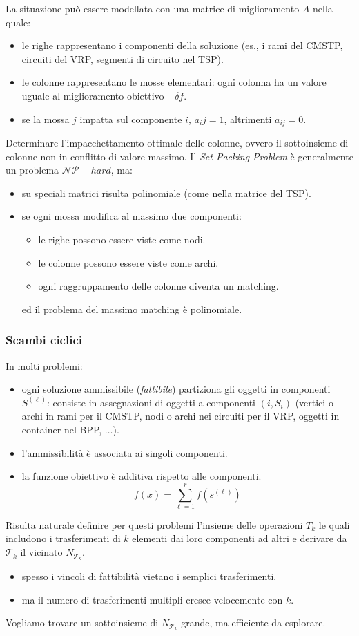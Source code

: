 \documentclass{article}
\begin{document}
La situazione può essere modellata con una matrice di miglioramento $A$ nella quale:
\begin{itemize}
    \item le righe rappresentano i componenti della soluzione (es., i rami del
    CMSTP, circuiti del VRP, segmenti di circuito nel TSP).
    \item le colonne rappresentano le mosse elementari: ogni colonna ha un valore
    uguale al miglioramento obiettivo $-\delta f$.
    \item se la mossa $j$ impatta sul componente $i$, $a_{i}j=1$, altrimenti $a_{ij}=0$.
\end{itemize}
Determinare l'impacchettamento ottimale delle colonne, ovvero il sottoinsieme di
colonne non in conflitto di valore massimo.
Il \textit{Set Packing Problem} è generalmente un problema $\mathcal{NP}-hard$, ma:
\begin{itemize}
    \item su speciali matrici risulta polinomiale (come nella matrice del TSP).
    \item se ogni mossa modifica al massimo due componenti:
    \begin{itemize}
        \item le righe possono essere viste come nodi.
        \item le colonne possono essere viste come archi.
        \item ogni raggruppamento delle colonne diventa un matching.
    \end{itemize}
    ed il problema del massimo matching è polinomiale.
\end{itemize}

\subsubsection{Scambi ciclici}
In molti problemi:
\begin{itemize}
    \item ogni soluzione ammissibile (\textit{fattibile}) partiziona gli
     oggetti in componenti $S^{(\ell)}$: consiste in assegnazioni di oggetti
     a componenti $(i,S_i)$ (vertici o archi in rami per il CMSTP, nodi o archi
     nei circuiti per il VRP, oggetti in container nel BPP, $\dots$).

    \item l'ammissibilità è associata ai singoli componenti.
    \item la funzione obiettivo è additiva rispetto alle componenti.
    $$f(x)=\sum_{\ell=1}^r f(s^{(\ell)})$$
\end{itemize}
Risulta naturale definire per questi problemi l'insieme delle operazioni $\mathcal{}T_k$
le quali includono i trasferimenti di $k$ elementi dai loro componenti ad altri e derivare
da $\mathcal{T}_k$ il vicinato $N_{\mathcal{T}_k}$.
\begin{itemize}
    \item spesso i vincoli di fattibilità vietano i semplici trasferimenti.
    \item ma il numero di trasferimenti multipli cresce velocemente con $k$.
\end{itemize}
Vogliamo trovare un sottoinsieme di $N_{\mathcal{T}_k}$ grande, ma efficiente da esplorare.
\end{document}

